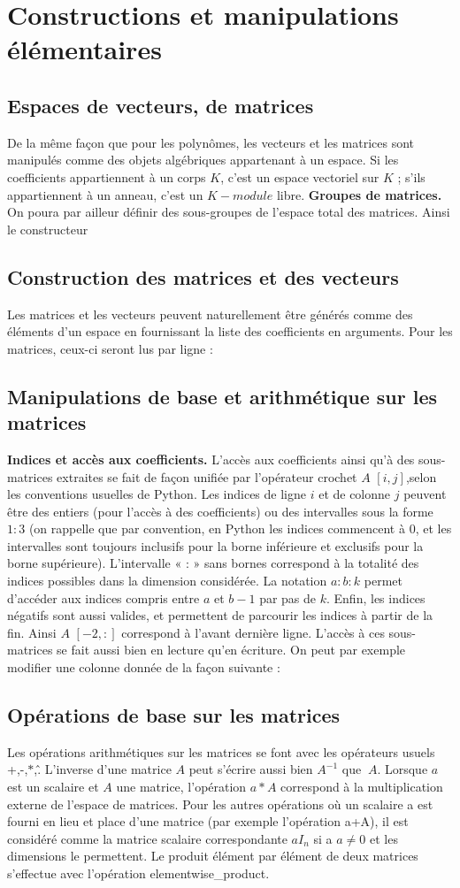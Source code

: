 \section{Constructions et manipulations élémentaires}
\subsection{ Espaces de vecteurs, de matrices}
De la même façon que pour les polynômes, les vecteurs et les matrices sont
manipulés comme des objets algébriques appartenant à un espace. Si les coefficients
appartiennent à un corps $K$, c’est un espace vectoriel sur $K$ ; s’ils appartiennent
à un anneau, c’est un $K-module$ libre.
\textbf{Groupes de matrices.} On poura par ailleur définir des sous-groupes de l'espace total des matrices. Ainsi le constructeur 
\subsection{ Construction des matrices et des vecteurs}
Les matrices et les vecteurs peuvent naturellement être générés comme des éléments d’un espace en fournissant la liste des coefficients en arguments. Pour les matrices, ceux-ci seront lus par ligne :
\subsection{ Manipulations de base et arithmétique sur les matrices}
\textbf{Indices et accès aux coefficients.} L'accès aux coefficients ainsi qu’à des
sous-matrices extraites se fait de façon unifiée par l’opérateur crochet $A$ $\left[i, j\right]$,selon les 
conventions usuelles de Python. Les indices de ligne $i$ et de colonne $j$ peuvent être des entiers (pour 
l’accès à des coefficients) ou des intervalles sous la forme $1:3$ (on rappelle que par convention, en Python 
les indices commencent à $0$, et les intervalles sont toujours inclusifs pour la borne inférieure et exclusifs 
pour la borne supérieure). L’intervalle « : » sans bornes correspond à la totalité des indices possibles dans la 
dimension considérée. La notation $a:b:k$ permet d’accéder aux indices compris entre $a$ et $b-1$ par pas de 
$k$. Enfin, les indices négatifs sont aussi valides, et permettent de parcourir les indices à partir de la
fin. Ainsi $A$ $\left[-2,:\right]$ correspond à l’avant dernière ligne. L'accès à ces sous-matrices
se fait aussi bien en lecture qu’en écriture. On peut par exemple modifier une colonne donnée de la façon 
suivante :
\subsection{ Opérations de base sur les matrices}
Les opérations arithmétiques sur les matrices se font avec les opérateurs usuels +,-,$\ast$,\^. L’inverse 
d’une matrice $A$ peut s’écrire aussi bien $A^{-1}$ que $~A$. Lorsque $a$ est un scalaire et $A$ une matrice, 
l’opération $a*A$ correspond à la multiplication externe de l’espace de matrices. Pour les autres opérations où 
un scalaire a est fourni en lieu et place d’une matrice (par exemple l’opération a+A), il est considéré comme la 
matrice scalaire correspondante $aI_{n}$ si a $a\neq 0$ et les dimensions le permettent. Le produit élément par 
élément de deux matrices s’effectue avec l’opération elementwise\_product.
